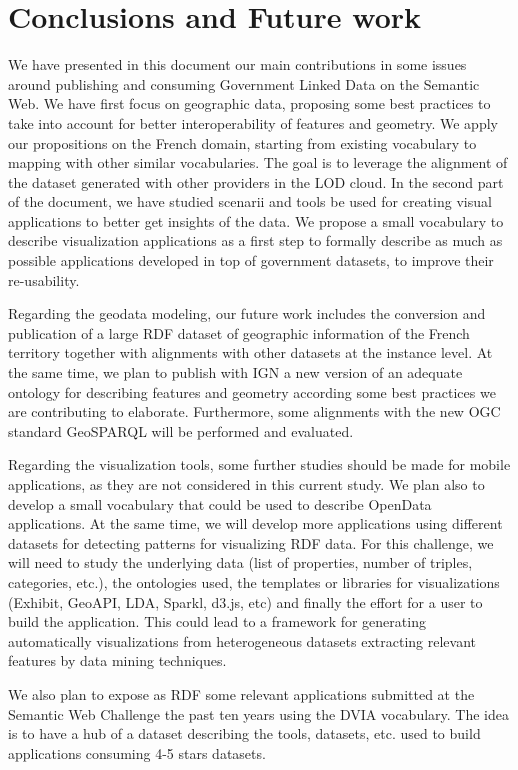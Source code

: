 \documentclass[a4paper,11pt]{report}
\begin{document}
   


\chapter{Conclusions and Future work}

We have presented in this document our main contributions in some issues around publishing and consuming Government Linked Data on the Semantic Web. We have first focus on geographic data, proposing some best practices to take into account for better interoperability of features and geometry.
We apply our propositions on the French domain, starting from existing vocabulary to mapping with other similar vocabularies. The goal is to leverage the alignment of the dataset generated with other providers in the LOD cloud. In the second part of the document, we have studied scenarii and tools 
be used for creating visual applications to better get insights of the data. We propose a small vocabulary to describe visualization applications as a first step to formally describe as much as possible applications developed in top of government datasets, to improve their re-usability. %

Regarding the geodata modeling, our future work includes the conversion and publication of a large RDF dataset of geographic information of the French territory together with alignments with other datasets at the instance level. At the same time, we plan to publish with IGN a new version of an adequate ontology for describing features and geometry according some best practices we are contributing to elaborate. Furthermore, some alignments with the new OGC standard GeoSPARQL will be performed and evaluated.

Regarding the visualization tools, some further studies should be made for mobile applications, as they are not considered in this current study. We plan also to develop a small vocabulary that could be used to describe OpenData applications. At the same time, we will develop  more applications using different datasets for detecting patterns for visualizing RDF data. For this challenge, we will need to study the underlying data (list of properties, number of triples, categories, etc.), the ontologies used, the templates or libraries for visualizations (Exhibit, GeoAPI, LDA, Sparkl, d3.js, etc) and finally the effort for a user to build the application. This could lead to a framework for generating automatically visualizations from heterogeneous datasets extracting relevant features by data mining techniques. 

We also plan to expose as RDF some relevant applications submitted at the Semantic Web Challenge the past ten years using the DVIA vocabulary. The idea is to have a hub of a dataset describing the tools, datasets, etc.  used to build  applications consuming 4-5 stars datasets.


\nocite{*}



\end{document}
